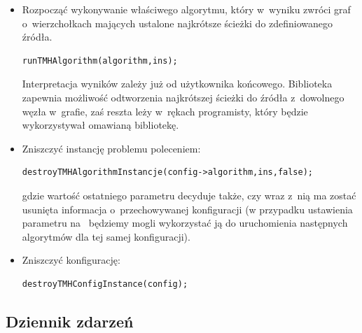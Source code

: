 \begin{itemize}
\item Rozpocząć wykonywanie właściwego algorytmu, który w~wyniku zwróci graf o~wierzchołkach mających ustalone najkrótsze ścieżki do zdefiniowanego źródła.
\begin{lstlisting}[style=customc]
runTMHAlgorithm(algorithm,ins);
\end{lstlisting}
Interpretacja wyników zależy już od użytkownika końcowego.
Biblioteka zapewnia możliwość odtworzenia najkrótszej ścieżki do źródła z~dowolnego węzła w~grafie, zaś reszta leży w~rękach programisty, który będzie wykorzystywał omawianą bibliotekę.
\item Zniszczyć instancję problemu poleceniem:
\begin{lstlisting}[style=customc]
destroyTMHAlgorithmInstancje(config->algorithm,ins,false);
\end{lstlisting}
gdzie wartość ostatniego parametru decyduje także, czy wraz z~nią ma zostać usunięta informacja o~przechowywanej konfiguracji (w przypadku ustawienia parametru na \KwFalse~będziemy mogli wykorzystać ją do uruchomienia następnych algorytmów dla tej samej konfiguracji).
\item Zniszczyć konfigurację:
\begin{lstlisting}[style=customc]
destroyTMHConfigInstance(config);
\end{lstlisting}
\end{itemize}



\subsection{Dziennik zdarzeń}




